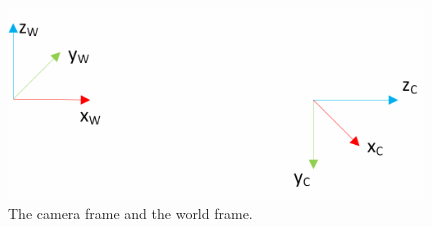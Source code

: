   
\begin{figure}
  \centering
  \includegraphics[width=0.98\textwidth]{images/world_camera_frame.pdf}
  \caption{The camera frame and the world frame.}
  \label{pics:worldcamframe}
\end{figure}
 
